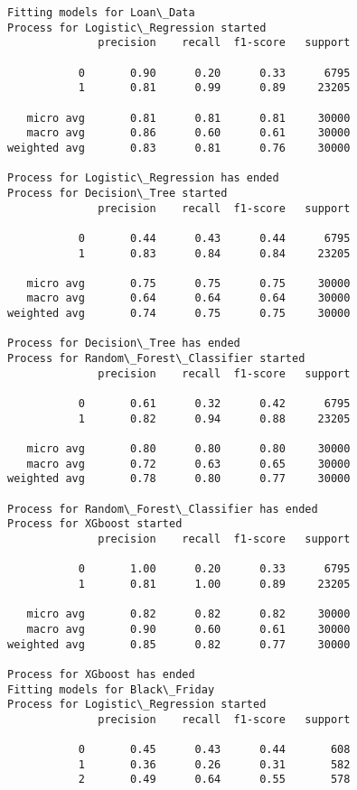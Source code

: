 \documentclass[11pt]{article}
\begin{document}
    \begin{Verbatim}[commandchars=\\\{\}]
Fitting models for Loan\_Data
Process for Logistic\_Regression started
              precision    recall  f1-score   support

           0       0.90      0.20      0.33      6795
           1       0.81      0.99      0.89     23205

   micro avg       0.81      0.81      0.81     30000
   macro avg       0.86      0.60      0.61     30000
weighted avg       0.83      0.81      0.76     30000

Process for Logistic\_Regression has ended
Process for Decision\_Tree started
              precision    recall  f1-score   support

           0       0.44      0.43      0.44      6795
           1       0.83      0.84      0.84     23205

   micro avg       0.75      0.75      0.75     30000
   macro avg       0.64      0.64      0.64     30000
weighted avg       0.74      0.75      0.75     30000

Process for Decision\_Tree has ended
Process for Random\_Forest\_Classifier started
              precision    recall  f1-score   support

           0       0.61      0.32      0.42      6795
           1       0.82      0.94      0.88     23205

   micro avg       0.80      0.80      0.80     30000
   macro avg       0.72      0.63      0.65     30000
weighted avg       0.78      0.80      0.77     30000

Process for Random\_Forest\_Classifier has ended
Process for XGboost started
              precision    recall  f1-score   support

           0       1.00      0.20      0.33      6795
           1       0.81      1.00      0.89     23205

   micro avg       0.82      0.82      0.82     30000
   macro avg       0.90      0.60      0.61     30000
weighted avg       0.85      0.82      0.77     30000

Process for XGboost has ended
Fitting models for Black\_Friday
Process for Logistic\_Regression started
              precision    recall  f1-score   support

           0       0.45      0.43      0.44       608
           1       0.36      0.26      0.31       582
           2       0.49      0.64      0.55       578


\end{Verbatim}
\end{document}
